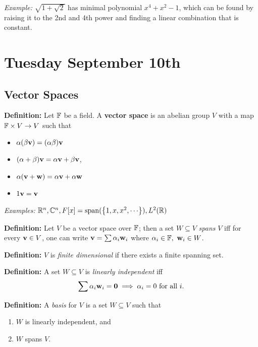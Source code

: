 \emph{Example:} \(\sqrt{1 + \sqrt 2}\) has minimal polynomial
\(x^4 + x^2 - 1\), which can be found by raising it to the 2nd and 4th
power and finding a linear combination that is constant.

\hypertarget{tuesday-september-10th}{%
\section{Tuesday September 10th}\label{tuesday-september-10th}}

\hypertarget{vector-spaces}{%
\subsection{Vector Spaces}\label{vector-spaces}}

\textbf{Definition:} Let \({\mathbb{F}}\) be a field. A \textbf{vector space} is
an abelian group \(V\) with a map \({\mathbb{F}} \times V \to V\) such that

\begin{itemize}
\item
  \(\alpha(\beta \mathbf{v}) = (\alpha \beta) \mathbf{v}\)
\item
  \((\alpha + \beta)\mathbf{v} = \alpha \mathbf{v} + \beta \mathbf{v}\),
\item
  \(\alpha(\mathbf{v} + \mathbf{w}) = \alpha \mathbf{v} + \alpha \mathbf{w}\)
\item
  \(1\mathbf{v} = \mathbf{v}\)
\end{itemize}

\emph{Examples:}
\({\mathbb{R}}^n, {\mathbb{C}}^n , F[x] = \mathrm{span}(\left\{{1, x, x^2, \cdots}\right\}), L^2({\mathbb{R}})\)

\textbf{Definition:} Let \(V\) be a vector space over \({\mathbb{F}}\); then a
set \(W \subseteq V\) \emph{spans} \(V\) iff for every
\(\mathbf{v}\in V\), one can write
\(\mathbf{v} = \sum \alpha_i \mathbf{w}_i\) where
\(\alpha_i \in {\mathbb{F}},~\mathbf{w}_i \in W\).

\textbf{Definition:} \(V\) is \emph{finite dimensional} if there exists
a finite spanning set.

\textbf{Definition:} A set \(W \subseteq V\) is \emph{linearly
independent} iff
\begin{align*}
\sum \alpha_i \mathbf{w}_i = \mathbf{0} \implies \alpha_i = 0 \text{ for all } i
.\end{align*}

\textbf{Definition:} A \emph{basis} for \(V\) is a set \(W \subseteq V\)
such that

\begin{enumerate}
\def\labelenumi{\arabic{enumi}.}
\item
  \(W\) is linearly independent, and
\item
  \(W\) spans \(V\).
\end{enumerate}

